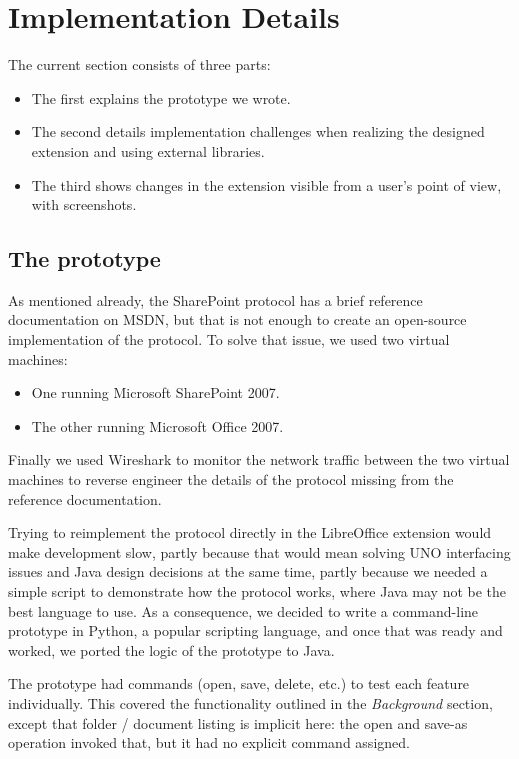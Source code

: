 \chapter{Implementation Details}

The current section consists of three parts:

\begin{itemize}
\item The first explains the prototype we wrote.
\item The second details implementation challenges when realizing the designed extension and using external libraries.
\item The third shows changes in the extension visible from a user's point of view, with screenshots.
\end{itemize}

\section{The prototype}

As mentioned already, the SharePoint protocol has a brief reference
documentation on MSDN, but that is not enough to create an open-source
implementation of the protocol. To solve that issue, we used two virtual
machines:

\begin{itemize}
\item One running Microsoft SharePoint 2007.
\item The other running Microsoft Office 2007.
\end{itemize}

Finally we used Wireshark\cite{wireshark} to monitor the network traffic
between the two virtual machines to reverse engineer the details of the
protocol missing from the reference documentation.

Trying to reimplement the protocol directly in the LibreOffice extension would
make development slow, partly because that would mean solving UNO interfacing
issues and Java design decisions at the same time, partly because we needed a
simple script to demonstrate how the protocol works, where Java may not be the
best language to use. As a consequence, we decided to write a command-line
prototype in Python, a popular scripting language, and once that was ready and
worked, we ported the logic of the prototype to Java.

The prototype had commands (open, save, delete, etc.) to test each feature
individually.  This covered the functionality outlined in the \emph{Background}
section, except that folder / document listing is implicit here: the open and
save-as operation invoked that, but it had no explicit command assigned.

